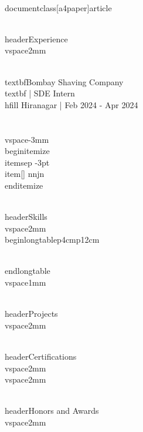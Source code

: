 \\documentclass[a4paper]{article}
\begin{document}
%
%
\\header{Experience}
\\vspace{2mm}

\\textbf{Bombay Shaving Company}\\textbf{ | SDE Intern} \\hfill Hiranagar | Feb 2024 - Apr 2024\\\\
\\vspace{-3mm}
\\begin{itemize} \\itemsep -3pt
\\item[] nnjn
\\end{itemize}

%
%
\\header{Skills}
\\vspace{2mm}
\\begin{longtable}{p{4cm}p{12cm}}

\\end{longtable}
\\vspace{1mm}

%
%
\\header{Projects}
\\vspace{2mm}

%
%
\\header{Certifications}
\\vspace{2mm}
\\vspace{2mm}

%
%
\\header{Honors and Awards}
\\vspace{2mm}

\
\end{document}
